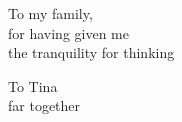 \thispagestyle{empty}
\begin{flushright}
    \null{}
        To my family,\\for having given me\\the tranquility for thinking
    \null
\end{flushright}
\vspace{-1.3\textwidth}
\begin{flushright}
    \null{}
        To Tina\\far together
    \null
\end{flushright}
